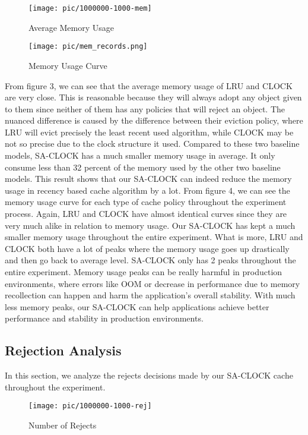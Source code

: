 \documentclass[conference]{IEEEtran}
\begin{document}
\begin{figure}[h]
\centerline{\texttt{[image: pic/1000000-1000-mem]}}
\caption{Average Memory Usage}
\label{fig}
\end{figure}

\begin{figure}[h]
\centerline{\texttt{[image: pic/mem\_records.png]}}
\caption{Memory Usage Curve}
\label{fig}
\end{figure}

From figure 3, we can see that the average memory usage of LRU and CLOCK are very close. This is reasonable because they will always adopt any object given to them since neither of them has any policies that will reject an object. The nuanced difference is caused by the difference between their eviction policy, where LRU will evict precisely the least recent used algorithm, while CLOCK may be not so precise due to the clock structure it used. Compared to these two baseline models, SA-CLOCK has a much smaller memory usage in average. It only consume less than 32 percent of the memory used by the other two baseline models. This result shows that our SA-CLOCK can indeed reduce the memory usage in recency based cache algorithm by a lot.  
From figure 4, we can see the memory usage curve for each type of cache policy throughout the experiment process. Again, LRU and CLOCK have almost identical curves since they are very much alike in relation to memory usage. Our SA-CLOCK has kept a much smaller memory usage throughout the entire experiment. What is more, LRU and CLOCK both have a lot of peaks where the memory usage goes up drastically and then go back to average level. SA-CLOCK only has 2 peaks throughout the entire experiment. Memory usage peaks can be really harmful in production environments, where errors like OOM or decrease in performance due to memory recollection can happen and harm the application's overall stability. With much less memory peaks, our SA-CLOCK can help applications achieve better performance and stability in production environments.


\subsection{Rejection Analysis}
In this section, we analyze the rejects decisions made by our SA-CLOCK cache throughout the experiment. 

\begin{figure}[h]
\centerline{\texttt{[image: pic/1000000-1000-rej]}}
\caption{Number of Rejects}
\label{fig}
\end{figure}
\end{document}
